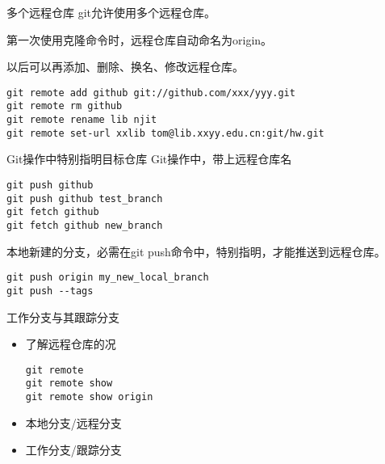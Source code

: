 \begin{frame}[fragile]{多个远程仓库}
git允许使用多个远程仓库。

第一次使用克隆命令时，远程仓库自动命名为origin。

以后可以再添加、删除、换名、修改远程仓库。

\begin{Verbatim}[frame=single,commandchars=\\\{\}]
git remote add github git://github.com/xxx/yyy.git
git remote rm github
git remote rename lib njit
git remote set-url xxlib tom@lib.xxyy.edu.cn:git/hw.git
\end{Verbatim}
\end{frame}

\begin{frame}[fragile]{Git操作中特别指明目标仓库}
Git操作中，带上远程仓库名

\onslide<+->
\begin{Verbatim}[frame=single,commandchars=\\\{\}]
git push github
git push github test_branch
git fetch github
git fetch github new_branch
\end{Verbatim}

\onslide<+->
本地新建的分支，必需在git push命令中，特别指明，才能推送到远程仓库。

\begin{Verbatim}[frame=single,commandchars=\\\{\}]
git push origin my_new_local_branch
git push --tags
\end{Verbatim}
\end{frame}

\begin{frame}[<+->][fragile]{工作分支与其跟踪分支}
    \begin{itemize}
        \item 了解远程仓库的况
        \begin{Verbatim}[frame=single,commandchars=\\\{\}]
git remote
git remote show
git remote show origin
        \end{Verbatim}
        \item 本地分支/远程分支
        \item 工作分支/跟踪分支
    \end{itemize}
\end{frame}

